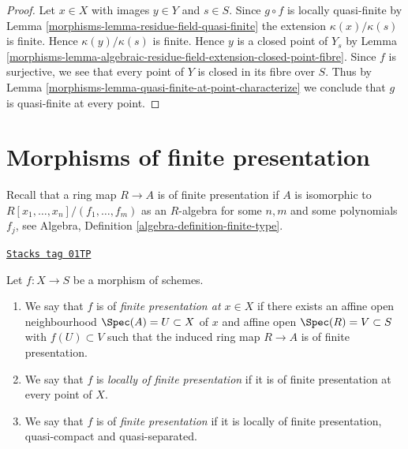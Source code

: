 \begin{proof}

Let $x \in X$ with images $y \in Y$ and $s \in S$.
Since $g \circ f$ is locally quasi-finite by
Lemma \ref{morphisms-lemma-residue-field-quasi-finite}
the extension $\kappa(x)/\kappa(s)$ is finite.
Hence $\kappa(y)/\kappa(s)$ is finite. Hence
$y$ is a closed point of $Y_s$ by
Lemma \ref{morphisms-lemma-algebraic-residue-field-extension-closed-point-fibre}.
Since $f$ is surjective, we see that every point of $Y$ is
closed in its fibre over $S$. Thus by
Lemma \ref{morphisms-lemma-quasi-finite-at-point-characterize}
we conclude that $g$ is quasi-finite at every point.
\end{proof}

\section{Morphisms of finite presentation}
\label{morphisms-section-finite-presentation}
Recall that a ring map $R \to A$ is of finite presentation if
$A$ is isomorphic to $R[x_1, \ldots, x_n]/(f_1, \ldots, f_m)$ as
an $R$-algebra for some $n, m$ and some polynomials $f_j$, see
Algebra, Definition \ref{algebra-definition-finite-type}.

\begin{definition}
\label{morphisms-definition-finite-presentation}
\href{https://stacks.math.columbia.edu/tag/01TP}{\texttt{Stacks tag 01TP}}

Let $f : X \to S$ be a morphism of schemes.
\begin{enumerate}
\item We say that $f$ is of {\it finite presentation at $x \in X$} if
there exists an affine open neighbourhood $\Spec(A) = U \subset X$
of $x$ and affine open $\Spec(R) = V \subset S$
with $f(U) \subset V$ such that the induced ring map
$R \to A$ is of finite presentation.
\item We say that $f$ is {\it locally of finite presentation} if it is
of finite presentation at every point of $X$.
\item We say that $f$ is of {\it finite presentation} if it is locally of
finite presentation, quasi-compact and quasi-separated.
\end{enumerate}
\end{definition}

